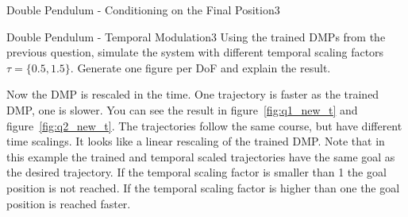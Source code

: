 \begin{questions}
\begin{question}{Double Pendulum - Conditioning on the Final Position}{3}
\end{question}


\begin{question}{Double Pendulum - Temporal Modulation}{3}
Using the trained DMPs from the previous question, simulate the system with different temporal scaling factors $\tau=\{0.5, 1.5\}$. Generate one figure per DoF and explain the result.

\begin{answer}
	
Now the DMP is rescaled in the time. One trajectory is faster as the trained DMP, one is slower. You can see the result in figure~\ref{fig:q1_new_t} and figure~\ref{fig:q2_new_t}. The trajectories follow the same course, but have different time scalings. It looks like a linear rescaling of the trained DMP.
Note that in this example the trained and temporal scaled trajectories have the same goal as the desired trajectory. If the temporal scaling factor is smaller than 1 the goal position is not reached. If the temporal scaling factor is higher than one the goal position is reached faster.


\end{answer}
\end{question}
\end{questions}
